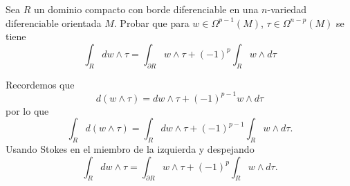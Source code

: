 \documentclass[twoside]{article}
\begin{document}
\begin{ejercicio}{10.6}
Sea $R$ un dominio compacto con borde diferenciable en una $n$-variedad diferenciable orientada $M$. Probar que para $w\in\Omega^{p-1}(M)$, $\tau\in\Omega^{n-p}(M)$ se tiene
\[
\int_R dw\land \tau=\int_{\partial R}w\land\tau+(-1)^p\int_R w\land d\tau
\]
\end{ejercicio}
\begin{solucion}
Recordemos que 
\[
d(w\land\tau)=dw\land \tau +(-1)^{p-1} w\land d\tau
\]
por lo que
\[
\int_R d(w\land\tau)=\int_R dw\land \tau +(-1)^{p-1}\int_R w\land d\tau.
\]
Usando Stokes en el miembro de la izquierda y despejando
\[
\int_R dw\land \tau=\int_{\partial R}w\land\tau+(-1)^p\int_R w\land d\tau.
\]
\end{solucion}
\end{document}

